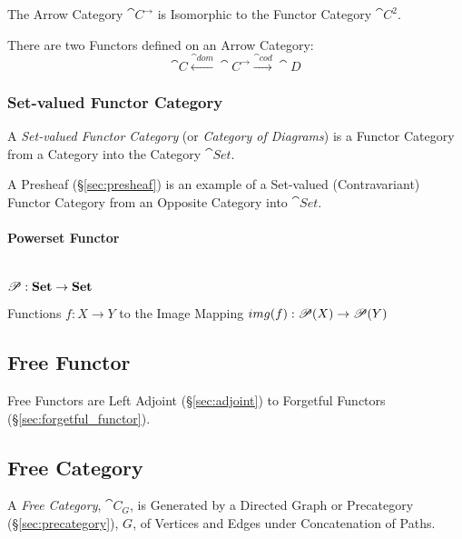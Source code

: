 The Arrow Category $\cat{C}^\rightarrow$ is Isomorphic to the
Functor Category $\cat{C^2}$.

There are two Functors defined on an Arrow Category:
\[
  \cat{C} \xleftarrow{\cat{dom}} \cat{C}^\rightarrow
  \xrightarrow{\cat{cod}} \cat{D}
\]



\subsubsection{Set-valued Functor Category}\label{sec:setvalued_functor}

A \emph{Set-valued Functor Category} (or \emph{Category of Diagrams})
is a Functor Category from a Category into the Category
$\cat{Set}$.

A Presheaf (\S\ref{sec:presheaf}) is an example of a Set-valued
(Contravariant) Functor Category from an Opposite Category into
$\cat{Set}$.



\paragraph{Powerset Functor}\label{sec:powerset_functor}
\hfill \\

$\mathscr{P} : \mathbf{Set} \rightarrow \mathbf{Set}$

Functions $f : X \rightarrow Y$ to the Image Mapping $img(f) :
\mathscr{P}(X) \rightarrow \mathscr{P}(Y)$



\subsection{Free Functor}\label{sec:free_functor}

Free Functors are Left Adjoint (\S\ref{sec:adjoint}) to Forgetful
Functors (\S\ref{sec:forgetful_functor}).



\subsection{Free Category}\label{sec:free_category}

A \emph{Free Category}, $\cat{C}_G$, is Generated by a Directed
Graph or Precategory (\S\ref{sec:precategory}), $G$, of Vertices
and Edges under Concatenation of Paths.

